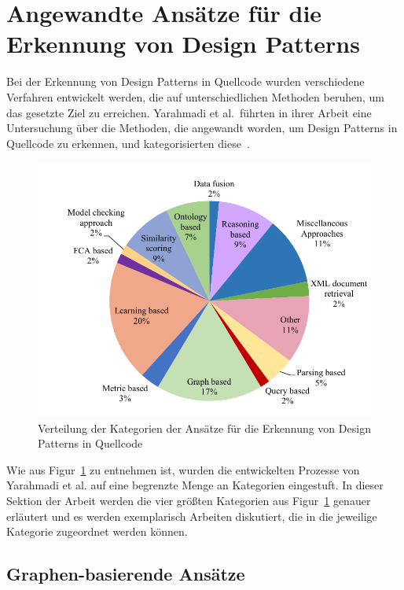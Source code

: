 \section{Angewandte Ansätze für die Erkennung von Design Patterns}

Bei der Erkennung von Design Patterns in Quellcode wurden verschiedene Verfahren entwickelt werden, die auf unterschiedlichen Methoden beruhen, um das gesetzte Ziel zu erreichen.
Yarahmadi et al.~führten in ihrer Arbeit eine Untersuchung über die Methoden, die angewandt worden, um Design Patterns in Quellcode zu erkennen, und kategorisierten diese~\cite[S. 5805]{yarahmadi2020design}.

\begin{figure}[h]
    \centering
    \includegraphics[scale=0.5]{figures/approches_distribution.png}
    \caption{Verteilung der Kategorien der Ansätze für die Erkennung von Design Patterns in Quellcode}
    \label{fig:approach_dist}
\end{figure}

Wie aus Figur~\ref{fig:approach_dist} zu entnehmen ist, wurden die entwickelten Prozesse von Yarahmadi et al. auf eine begrenzte Menge an Kategorien eingestuft.
In dieser Sektion der Arbeit werden die vier größten Kategorien aus Figur~\ref{fig:approach_dist} genauer erläutert und es werden exemplarisch Arbeiten diskutiert,
die in die jeweilige Kategorie zugeordnet werden können. 

\subsection{Graphen-basierende Ansätze}

